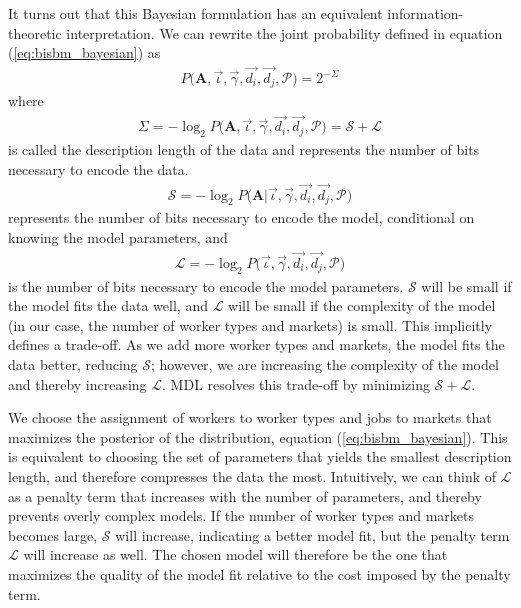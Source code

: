 \documentclass[12pt]{article}
\def\g{\gamma}
\def\i{\iota}
\theoremstyle{definition}
\theoremstyle{plain}
\begin{document}
It turns out that this Bayesian formulation has an equivalent information-theoretic interpretation. We can rewrite the joint probability defined in equation (\ref{eq:bisbm_bayesian}) as 
\begin{align*}
	P \bigg(\mathbf{A}, \vec{\i}, \vec{\g}, \vec{d_i}, \vec{d_j} , \mathbf{\mathcal{P}} \bigg) = 2^{-\Sigma}
\end{align*}
where
\begin{align*}
	\Sigma =-\log_2 P \bigg(\mathbf{A}, \vec{\i}, \vec{\g}, \vec{d_i}, \vec{d_j} , \mathbf{\mathcal{P}} \bigg) = \mathcal{S} + \mathcal{L}
\end{align*}
is called the description length of the data and represents the number of bits necessary to encode the data. 
\begin{align*}
	\mathcal{S} = - \log_2 P \bigg(\mathbf{A} \bigg|\vec{\i}, \vec{\g}, \vec{d_i}, \vec{d_j} , \mathbf{\mathcal{P}} \bigg)  
\end{align*}
represents the number of bits necessary to encode the model, conditional on knowing the model parameters, and
\begin{align*}
\mathcal{L} = - \log_2 P \bigg(\vec{\i}, \vec{\g}, \vec{d_i}, \vec{d_j} , \mathbf{\mathcal{P}} \bigg)  
\end{align*}
is the number of bits necessary to encode the model parameters.  $\mathcal{S}$ will be small if the model fits the data well, and $\mathcal{L}$ will be small if the complexity of the model (in our case, the number of worker types and markets) is small.  This implicitly defines a trade-off. As we add more worker types and markets, the model fits the data better, reducing  $\mathcal{S}$; however, we are increasing the complexity of the model and thereby increasing $\mathcal{L}$. MDL resolves this trade-off by minimizing  $\mathcal{S}+\mathcal{L}$.

We choose the assignment of workers to worker types and jobs to markets that maximizes the posterior of the distribution, equation (\ref{eq:bisbm_bayesian}). This is equivalent to choosing the set of parameters that yields the smallest description length, and therefore compresses the data the most. Intuitively, we can think of $\mathcal{L}$ as a penalty term that increases with the number of parameters, and thereby prevents overly complex models. If the number of worker types and markets becomes large, $\mathcal{S}$ will increase, indicating a better model fit, but the penalty term $\mathcal{L}$ will increase as well. The chosen model will therefore be the one that maximizes the quality of the model fit relative to the cost imposed by the penalty term. 
\end{document}
